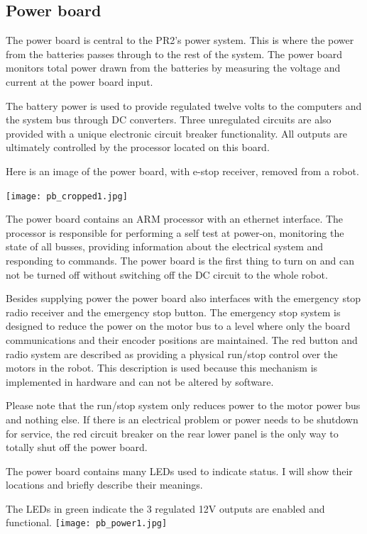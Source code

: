 \subsection{Power board}
The power board is central to the PR2's power system. This is where the power from the batteries passes through to the rest of the system. The power board monitors total power drawn from the batteries by measuring the voltage and current at the power board input.

The battery power is used to provide regulated twelve volts to the computers and the system bus through DC converters. Three unregulated circuits are also provided with a unique electronic circuit breaker functionality. All outputs are ultimately controlled by the processor located on this board.


Here is an image of the power board, with e-stop receiver, removed from a robot.

\texttt{[image: pb\_cropped1.jpg]}


The power board contains an ARM processor with an ethernet interface. The processor is responsible for performing a self test at power-on, monitoring the state of all busses, providing information about the electrical system and responding to commands. The power board is the first thing to turn on and can not be turned off without switching off the DC circuit to the whole robot.

Besides supplying power the power board also interfaces with the emergency stop radio receiver and the emergency stop button. The emergency stop system is designed to reduce the power on the motor bus to a level where only the board communications and their encoder positions are maintained. The red button and radio system are described as providing a physical run/stop control over the motors in the robot. This description is used because this mechanism is implemented in hardware and can not be altered by software. 

Please note that the run/stop system only reduces power to the motor power bus and nothing else. If there is an electrical problem or power needs to be shutdown for service, the red circuit breaker on the rear lower panel is the only way to totally shut off the power board.

The power board contains many LEDs used to indicate status. I will show their locations and briefly describe their meanings.

The LEDs in green indicate the 3 regulated 12V outputs are enabled and functional.
\texttt{[image: pb\_power1.jpg]} 


